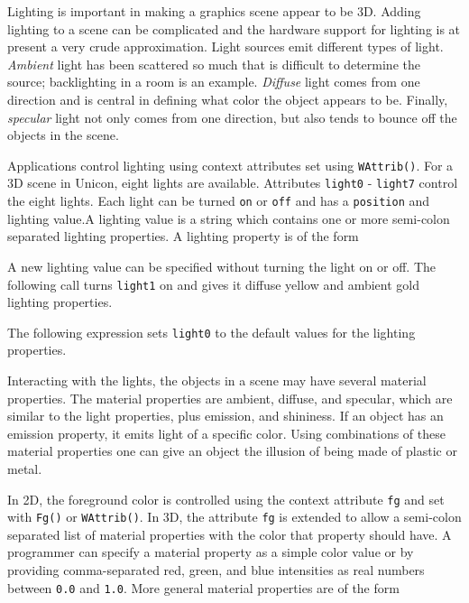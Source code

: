 Lighting is important in making a graphics scene appear to be 3D.
Adding lighting to a scene can be complicated and the hardware support
for lighting is at present a very crude approximation. Light sources
emit different types of light. \emph{Ambient} light has been scattered
so much that is difficult to determine the source; backlighting in a
room is an example. \emph{Diffuse} light comes from one direction and
is central in defining what color the object appears to be. Finally,
\emph{specular} light not only comes from one direction, but also
tends to bounce off the objects in the scene.

Applications control lighting using context attributes set using
\texttt{WAttrib()}. For a 3D scene in Unicon, eight lights are
available. Attributes \texttt{light0} - \texttt{light7} control the
eight lights. Each light can be turned \texttt{on} or \texttt{off}
and has a \texttt{position} and lighting value.A lighting value is a
string which contains one or more semi-colon separated lighting
properties. A lighting property is of the form


\noindent
A new lighting value can be specified without turning the light on or off.
The following call turns \texttt{light1} on and gives it diffuse
yellow and ambient gold lighting properties. 


\noindent
The following expression sets \texttt{light0} to the default values for
the lighting properties.



Interacting with the lights, the objects in a scene may have several
material properties. The material properties are ambient, diffuse, and
specular, which are similar to the light properties, plus emission,
and shininess. If an object has an emission property, it emits light
of a specific color. Using combinations of these material properties
one can give an object the illusion of being made of plastic or metal.

In 2D, the foreground color is controlled using the context attribute
\texttt{fg} and set with \texttt{Fg()} or \texttt{WAttrib()}.  In 3D,
the attribute \texttt{fg} is extended to allow a semi-colon separated
list of material properties with the color that property should have.
A programmer can specify a material property as a simple color value
or by providing comma-separated red, green, and blue intensities as
real numbers between \texttt{0.0} and \texttt{1.0}.  More general
material properties are of the form

